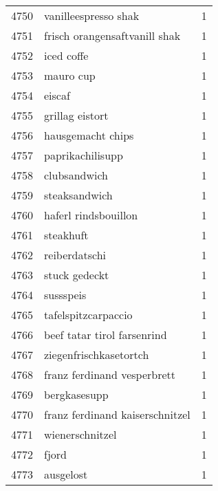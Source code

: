 \begin{tabular}{llr}
4750 &                               vanilleespresso shak &      1 \\
4751 &                      frisch orangensaftvanill shak &      1 \\
4752 &                                         iced coffe &      1 \\
4753 &                                          mauro cup &      1 \\
4754 &                                             eiscaf &      1 \\
4755 &                                    grillag eistort &      1 \\
4756 &                                  hausgemacht chips &      1 \\
4757 &                                   paprikachilisupp &      1 \\
4758 &                                       clubsandwich &      1 \\
4759 &                                      steaksandwich &      1 \\
4760 &                               haferl rindsbouillon &      1 \\
4761 &                                          steakhuft &      1 \\
4762 &                                      reiberdatschi &      1 \\
4763 &                                      stuck gedeckt &      1 \\
4764 &                                          sussspeis &      1 \\
4765 &                                tafelspitzcarpaccio &      1 \\
4766 &                        beef tatar tirol farsenrind &      1 \\
4767 &                             ziegenfrischkasetortch &      1 \\
4768 &                        franz ferdinand vesperbrett &      1 \\
4769 &                                       bergkasesupp &      1 \\
4770 &                    franz ferdinand kaiserschnitzel &      1 \\
4771 &                                    wienerschnitzel &      1 \\
4772 &                                              fjord &      1 \\
4773 &                                          ausgelost &      1 \\

\end{tabular}
